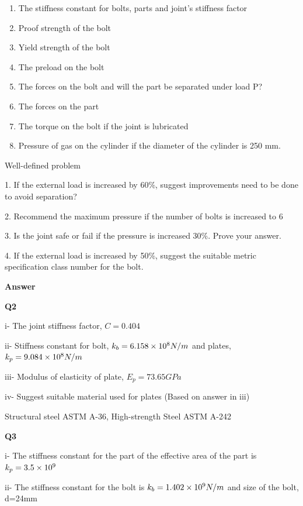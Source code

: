 \documentclass[a4paper, fleqn]{article}
\providecommand{\sci}[1]{\protect\ensuremath{\times 10^{\StrSubstitute[0]{#1}{e}{}}}}
\begin{document}
\begin{enumerate}[label=(\roman*)]
    \item The stiffness constant for bolts, parts and joint’s stiffness factor
    \item Proof strength of the bolt
    \item Yield strength of the bolt
    \item The preload on the bolt
    \item The forces on the bolt and will the part be separated under load P?
    \item The forces on the part
    \item The torque on the bolt if the joint is lubricated
    \item Pressure of gas on the cylinder if the diameter of the cylinder is 250 mm.

\end{enumerate}

Well-defined problem

1. If the external load is increased by 60\%, suggest improvements need to be done to avoid separation?

2. Recommend the maximum pressure if the number of bolts is increased to 6

3. Is the joint safe or fail if the pressure is increased 30\%. Prove your answer.

4. If the external load is increased by 50\%, suggest the suitable metric specification class number for the bolt.


\newpage

\textbf{Answer}
\vspace{10pt}

\textbf{Q2}

i- The joint stiffness factor, $C=0.404$

ii- Stiffness constant for bolt, $k_b=6.158\sci{e8}N/m$ and plates, $k_p=9.084\sci{e8}N/m$

iii- Modulus of elasticity of plate, $E_p=73.65GPa$

iv- Suggest suitable material used for plates (Based on answer in iii)

Structural steel ASTM A-36, High-strength Steel ASTM A-242

\vspace{10pt}
\textbf{Q3}

i- The stiffness constant for the part of the effective area of the part is $k_p=3.5\sci{e9}$

ii- The stiffness constant for the bolt is $k_b=1.402\sci{e9}N/m$ and size of the bolt, d=24mm
\end{document}
